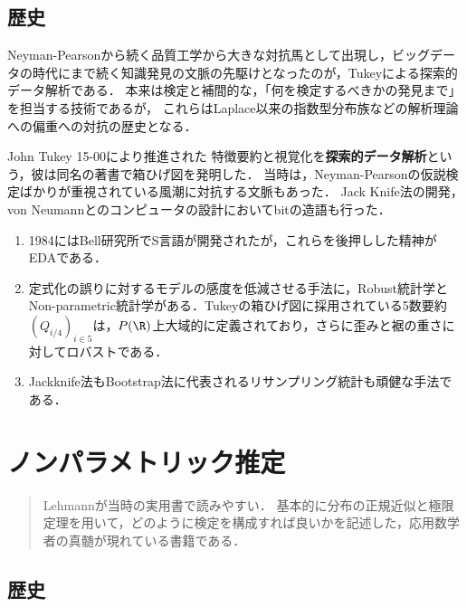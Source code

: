\documentclass[uplatex,dvipdfmx]{jsreport}
\begin{document}
\section{歴史}

\begin{tcolorbox}[colframe=ForestGreen, colback=ForestGreen!10!white,breakable,colbacktitle=ForestGreen!40!white,coltitle=black,fonttitle=\bfseries\sffamily,
title=]
    Neyman-Pearsonから続く品質工学から大きな対抗馬として出現し，ビッグデータの時代にまで続く知識発見の文脈の先駆けとなったのが，Tukeyによる探索的データ解析である．
    本来は検定と補間的な，「何を検定するべきかの発見まで」を担当する技術であるが，
    これらはLaplace以来の指数型分布族などの解析理論への偏重への対抗の歴史となる．
\end{tcolorbox}

\begin{history}
    John Tukey 15-00により推進された
    特徴要約と視覚化を\textbf{探索的データ解析}という，彼は同名の著書で箱ひげ図を発明した．
    当時は，Neyman-Pearsonの仮説検定ばかりが重視されている風潮に対抗する文脈もあった．
    Jack Knife法の開発，von Neumannとのコンピュータの設計においてbitの造語も行った．
    \begin{enumerate}
        \item 1984にはBell研究所でS言語が開発されたが，これらを後押しした精神がEDAである．
        \item 定式化の誤りに対するモデルの感度を低減させる手法に，Robust統計学とNon-parametric統計学がある．Tukeyの箱ひげ図に採用されている5数要約$(Q_{i/4})_{i\in 5}$は，$P(\R)$上大域的に定義されており，さらに歪みと裾の重さに対してロバストである．
        \item Jackknife法もBootstrap法に代表されるリサンプリング統計も頑健な手法である．
    \end{enumerate}
\end{history}

\chapter{ノンパラメトリック推定}

\begin{quotation}
    Lehmann\cite{Lehmann}が当時の実用書で読みやすい．
    基本的に分布の正規近似と極限定理を用いて，どのように検定を構成すれば良いかを記述した，応用数学者の真髄が現れている書籍である．
\end{quotation}

\section{歴史}
\end{document}
